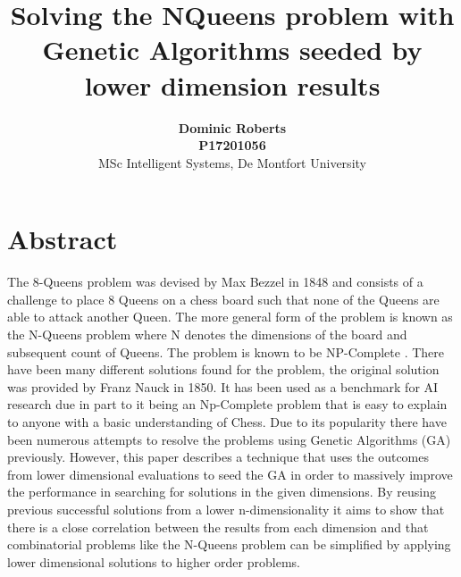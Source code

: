 \documentclass[a4paper,onecolumn,11pt]{article}
\begin{document}
\title{\vspace{-2.5cm}Solving the NQueens problem with Genetic Algorithms seeded by lower dimension results}
\author{\textbf{Dominic Roberts}\\
\textbf{P17201056}\\
MSc Intelligent Systems, De Montfort University
}%
\maketitle
\thispagestyle{empty}

\section{Abstract}
The 8-Queens problem was devised by Max Bezzel in 1848 and consists of a challenge to place 8 Queens on a chess board such that none of the Queens are able to attack another Queen. The more general form of the problem is known as the N-Queens problem where N denotes the dimensions of the board and subsequent count of Queens. The problem is known to be NP-Complete \cite{Complexity}. There have been many different solutions found for the problem, the original solution was provided by Franz Nauck in 1850. It has been used as a benchmark for AI research due in part to it being an Np-Complete problem that is easy to explain to anyone with a basic understanding of Chess. Due to its popularity there have been numerous attempts to resolve the problems using Genetic Algorithms (GA) previously. However, this paper describes a technique that uses the outcomes from lower dimensional evaluations to seed the GA in order to massively improve the performance in searching for solutions in the given dimensions. By reusing previous successful solutions from a lower n-dimensionality it aims to show that there is a close correlation between the results from each dimension and that combinatorial problems like the N-Queens problem can be simplified by applying lower dimensional solutions to higher order problems.
\end{document}
